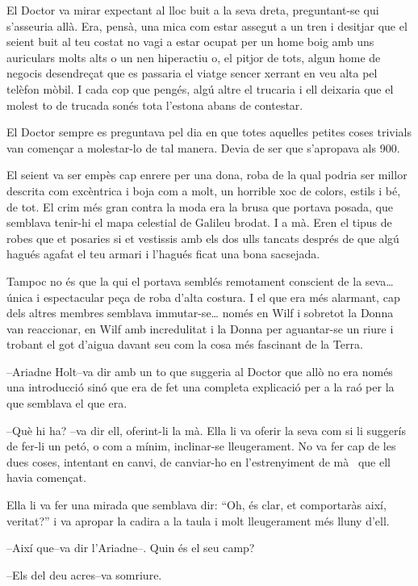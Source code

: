El Doctor va mirar expectant al lloc buit a la seva dreta, preguntant-se
qui s'asseuria allà. Era, pensà, una mica com estar assegut a un tren i
desitjar que el seient buit al teu costat no vagi a estar ocupat per un
home boig amb uns auriculars molts alts o un nen hiperactiu o, el pitjor
de tots, algun home de negocis desendreçat que es passaria el viatge
sencer xerrant en veu alta pel telèfon mòbil. I cada cop que pengés,
algú altre el trucaria i ell deixaria que el molest to de trucada sonés
tota l'estona abans de contestar.

El Doctor sempre es preguntava pel dia en que totes aquelles petites
coses trivials van començar a molestar-lo de tal manera. Devia de ser
que s'apropava als 900.

El seient va ser empès cap enrere per una dona, roba de la qual podria
ser millor descrita com excèntrica i boja com a molt, un horrible xoc de
colors, estils i bé, de tot. El crim més gran contra la moda era la
brusa que portava posada, que semblava tenir-hi el mapa celestial de
Galileu brodat. I a mà. Eren el tipus de robes que et posaries si et
vestissis amb els dos ulls tancats després de que algú hagués agafat el
teu armari i l'hagués ficat una bona sacsejada.

Tampoc no és que la qui el portava semblés remotament conscient de la
seva\ldots{} única i espectacular peça de roba d'alta costura. I el que
era més alarmant, cap dels altres membres semblava immutar-se\ldots{}
només en Wilf i sobretot la Donna van reaccionar, en Wilf amb
incredulitat i la Donna per aguantar-se un riure i trobant el got
d'aigua davant seu com la cosa més fascinant de la Terra.

--Ariadne Holt--va dir amb un to que suggeria al Doctor que allò no era
només una introducció sinó que era de fet una completa explicació per a
la raó per la que semblava el que era.

--Què hi ha? --va dir ell, oferint-li la mà. Ella li va oferir la seva
com si li suggerís de fer-li un petó, o com a mínim, inclinar-se
lleugerament. No va fer cap de les dues coses, intentant en canvi, de
canviar-ho en l'estrenyiment de mà ~que ell havia començat.

Ella li va fer una mirada que semblava dir: ``Oh, és clar, et
comportaràs així, veritat?'' i va apropar la cadira a la taula i molt
lleugerament més lluny d'ell.

--Així que--va dir l'Ariadne--. Quin és el seu camp?

--Els del deu acres--va somriure.

